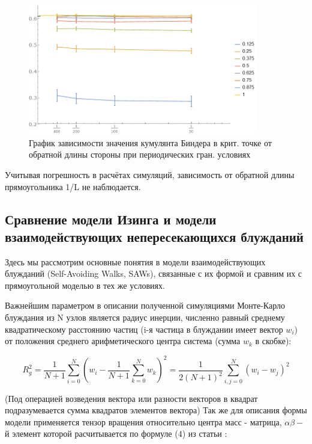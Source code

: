 \begin{figure}[!h]
    \centering
    \includegraphics[width=100mm]{Sections/Images/CumulantPBCL.png}
    \caption{График зависимости значения кумулянта Биндера в крит. точке от обратной длины стороны при периодических гран. условиях}
    \label{fig:CumulPBCL}
\end{figure}

Учитывая погрешность в расчётах симуляций, зависимость от обратной длины прямоугольника 1/L не наблюдается.

\subsection{Сравнение модели Изинга и модели взаимодействующих непересекающихся блужданий}

Здесь мы рассмотрим основные понятия в модели взаимодействующих блужданий (Self-Avoiding Walks, SAWs), связанные с их формой и сравним их с прямоугольной моделью в тех же условиях. 

Важнейшим параметром в описании полученной симуляциями Монте-Карло блуждания из N узлов является радиус инерции, численно равный среднему квадратическому расстоянию частиц (i-я частица в блуждании имеет вектор $w_{i}$) от положения среднего арифметического центра система (сумма $w_{k}$ в скобке)\cite{caracciolo2011geometrical}:

\begin{equation}\label{eq:Rg}
    R^{2}_{g} = \frac{1}{N+1} \sum^{N}_{i=0}\left(w_{i} - \frac{1}{N+1}\sum^{N}_{k=0}w_{k}\right)^2 = \frac{1}{2(N+1)^{2}}\sum^{N}_{i,j=0}(w_{i} - w_{j})^{2}
\end{equation}

(Под операцией возведения вектора или разности векторов в квадрат подразумевается сумма квадратов элементов вектора) Так же для описания формы модели применяется тензор вращения относительно центра масс - матрица, $\alpha\beta-$й элемент которой расчитывается по формуле (4) из статьи\cite{arkin2013gyration} :

